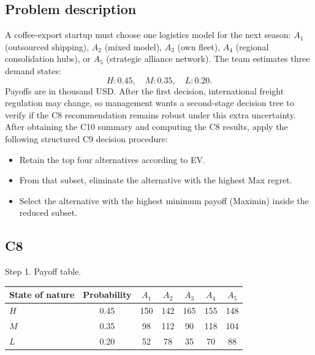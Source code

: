 

	
	\begin{ExamProblems}
		\item
		\subsection*{Problem description}
		A coffee-export startup must choose one logistics model for the next season:
		$A_1$ (outsourced shipping), $A_2$ (mixed model), $A_3$ (own fleet), $A_4$ (regional consolidation hubs), or $A_5$ (strategic alliance network).
		The team estimates three demand states:
		\[
		H:0.45,\quad M:0.35,\quad L:0.20.
		\]
		Payoffs are in thousand USD.
		After the first decision, international freight regulation may change, so management wants a second-stage decision tree to verify if the C8 recommendation remains robust under this extra uncertainty.
		After obtaining the C10 summary and computing the C8 results, apply the following structured C9 decision procedure:
		\begin{itemize}
			\item Retain the top four alternatives according to EV.
			\item From that subset, eliminate the alternative with the highest Max regret.
			\item Select the alternative with the highest minimum payoff (Maximin) inside the reduced subset.
		\end{itemize}

		\subsection*{C8}
		Step 1. Payoff table.
		\begin{center}
			\begin{tabular}{l c c c c c c}
				\toprule
				State of nature & Probability & $A_1$ & $A_2$ & $A_3$ & $A_4$ & $A_5$ \\
				\midrule
				$H$ & 0.45 & 150 & 142 & 165 & 155 & 148 \\
				$M$ & 0.35 & 98 & 112 & 90 & 118 & 104 \\
				$L$ & 0.20 & 52 & 78 & 35 & 70 & 88 \\
				\bottomrule
			\end{tabular}
		\end{center}


\end{ExamProblems}
